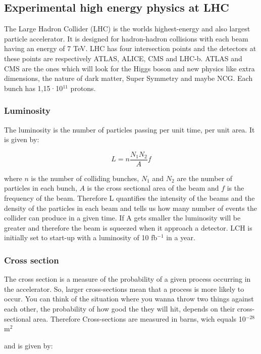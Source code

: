\subsection{Experimental high energy physics at LHC}
The Large Hadron Collider (LHC) is the worlds highest-energy and also largest particle accelerator. It is designed for hadron-hadron collisions with each beam having an energy of 7 TeV. LHC has four intersection points and the detectors at these points are respectively ATLAS, ALICE, CMS and LHC-b. ATLAS and CMS are the ones which will look for the Higgs boson and new physics like extra dimensions, the nature of dark matter, Super Symmetry and maybe NCG. Each bunch has 1,15·10$^{11}$ protons. 

\subsubsection{Luminosity}
The luminosity is the number of particles passing per unit time, per unit area. It is given by:

\begin{equation}
L=n\frac{N_{1}N_{2}}{A}f
\end{equation}

where $n$ is the number of colliding bunches, $N_{1}$ and $N_{2}$ are the number of particles in each bunch, $A$ is the cross sectional area of the beam and $f$ is the frequency of the beam. Therefore L quantifies the intensity of the beams and the density of the particles in each beam and tells us how many number of events the collider can produce in a given time. If A gets smaller the luminosity will be greater and therefore the beam is squeezed when it approach a detector. LCH is initially set to start-up with a luminosity of 10 fb$^{-1}$ in a year.

\subsubsection{Cross section}
The cross section is a measure of the probability of a given process occurring in the accelerator. So, larger cross-sections mean that a process is more likely to occur. You can think of the situation where you wanna throw two things against each other, the probability of how good the they will hit, depends on their cross-sectional area. Therefore Cross-sections are measured in barns, wich equals 10$^{-28}$ m$^{2}$



and is given by:

